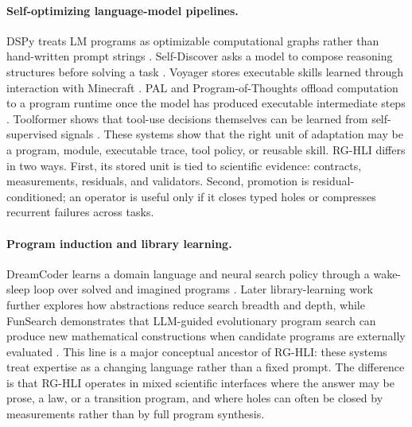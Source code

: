 \documentclass[letterpaper]{article}
\newcommand{\methodshort}{\textsc{RG-HLI}\xspace}
\begin{document}
\paragraph{Self-optimizing language-model pipelines.}
DSPy treats LM programs as optimizable computational graphs rather than
hand-written prompt strings \citep{dspy}. Self-Discover asks a model to compose
reasoning structures before solving a task \citep{selfdiscover}. Voyager stores
executable skills learned through interaction with Minecraft \citep{voyager}.
PAL and Program-of-Thoughts offload computation to a program runtime once the
model has produced executable intermediate steps \citep{pal,pot}. Toolformer
shows that tool-use decisions themselves can be learned from self-supervised
signals \citep{toolformer}. These systems show that the right unit of
adaptation may be a program, module, executable trace, tool policy, or reusable
skill. \methodshort differs in two ways. First, its stored unit is tied to
scientific evidence: contracts, measurements, residuals, and validators.
Second, promotion is residual-conditioned; an operator is useful only if it
closes typed holes or compresses recurrent failures across tasks.

\paragraph{Program induction and library learning.}
DreamCoder learns a domain language and neural search policy through a
wake-sleep loop over solved and imagined programs \citep{dreamcoder}. Later
library-learning work further explores how abstractions reduce search breadth
and depth, while FunSearch demonstrates that LLM-guided evolutionary program
search can produce new mathematical constructions when candidate programs are
externally evaluated \citep{funsearch}. This line is a major conceptual
ancestor of \methodshort: these systems treat expertise as a changing language
rather than a fixed prompt. The difference is that \methodshort operates in
mixed scientific interfaces where the answer may be prose, a law, or a
transition program, and where holes can often be closed by measurements rather
than by full program synthesis.
\end{document}
